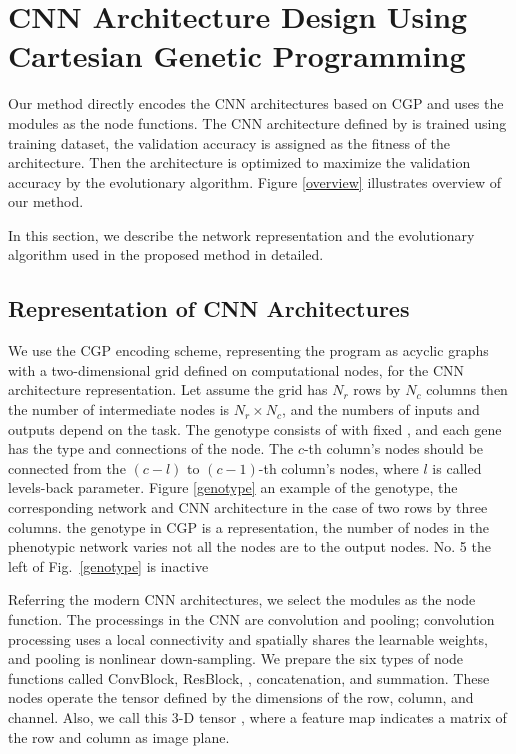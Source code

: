 \section{CNN Architecture Design Using Cartesian Genetic Programming}
Our method directly encodes the CNN architectures based on CGP \cite{harding_evolution_2008,miller_redundancy_2006,miller_cartesian_2000} and uses the  modules as the node functions.
The CNN architecture defined by  is trained using  training dataset,  the validation accuracy is assigned as the fitness of the architecture. Then\new{,} the architecture is optimized to maximize the validation accuracy by the evolutionary algorithm.
Figure \ref{overview} illustrates  overview of our method.

In this section, we describe the network representation and the evolutionary algorithm used in the proposed method in detailed.

\subsection{Representation of CNN Architectures}
We use the CGP encoding scheme, representing the program as  acyclic graphs with a two-dimensional grid defined on computational nodes, for the CNN architecture representation. Let  assume  the grid has $N_r$ rows by $N_c$ columns\new{;} then the number of intermediate nodes is $N_r \times N_c$, and the numbers of inputs and outputs depend on the task. The genotype consists of  with fixed , and each gene has   the type and connections of the node. The $c$-th column's nodes should be connected from the $(c-l)$ to $(c-1)$-th column's nodes, where $l$ is called  levels-back parameter. Figure \ref{genotype}  an example of the genotype, the corresponding network\new{,} and  CNN architecture in the case of two rows by three columns.  the genotype in CGP is a  representation, the number of nodes in the phenotypic network varies  not all  the nodes are  to the output nodes.  No. 5  the left  of Fig.~\ref{genotype} is  inactive 

Referring  the modern CNN architectures, we select the  modules as the node function.
The  processings in the CNN are convolution and pooling; convolution processing uses a local connectivity and spatially shares the learnable weights, and pooling is nonlinear down-sampling.
We prepare the six types of node functions called ConvBlock, ResBlock, , concatenation, and summation.
These nodes operate the  tensor defined by the dimensions of the row, column, and channel. Also, we call this 3-D tensor , where a feature map indicates a matrix of the row and column as  image plane.

